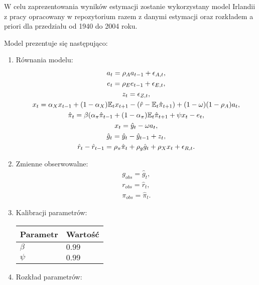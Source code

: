 W celu zaprezentowania wyników estymacji zostanie wykorzystany model Irlandii z pracy \cite{NBERw10309} opracowany w repozytorium \cite{Pfeifer_DSGE_mod_A_collection} razem z danymi estymacji oraz rozkładem a priori dla przedziału od 1940 do 2004 roku.

Model prezentuje się następująco:
\begin{enumerate}
    \item Równania modelu:
    \begin{gather}
        a_{t} = \rho_A a_{t-1} + \epsilon_{A,t},\\
        e_{t} = \rho_E e_{t-1} + \epsilon_{E,t},\\
        z_{t} = \epsilon_{Z,t},\\
        x_{t} = \alpha_X x_{t-1} + (1 - \alpha_X)\mathbb{E}_t x_{t+1} - (\hat{r} - \mathbb{E}_t \hat{\pi}_{t+1}) + (1-\omega) (1-\rho_A)a_{t},\\
        \hat{\pi}_{t} = \beta(\alpha_\pi \hat{\pi}_{t-1} + (1-\alpha_\pi)\mathbb{E}_t \hat{\pi}_{t+1} + \psi x_{t} - e_{t},\\
        x_{t} = \hat{y}_t - \omega a_{t},\\
        \hat{g}_{t} = \hat{y}_{t} - \hat{y}_{t-1} + z_t,\\
        \hat{r}_t - \hat{r}_{t-1} = \rho_\pi \hat{\pi}_t + \rho_g \hat{g}_t + \rho_X x_t + \epsilon_{R,t}.
    \end{gather}
    \item Zmienne obserwowalne:
    \begin{gather}
        g_{obs} = \hat{g}_t,\\
        r_{obs} = \hat{r}_t,\\
        \pi_{obs} = \hat{\pi}_t.
    \end{gather}
    \item Kalibracji parametrów:
        \begin{center}
            \begin{tabular}{|p{}|p{}|}
                \hline
                Parametr & Wartość \\
                \hline 
                $\beta$ & $0.99$\\
                $\psi$ & $0.99$ \\
                \hline 
            \end{tabular} 
         \end{center}
    \item Rozkład parametrów:
        \begin{center}

\end{center}
\end{enumerate}

